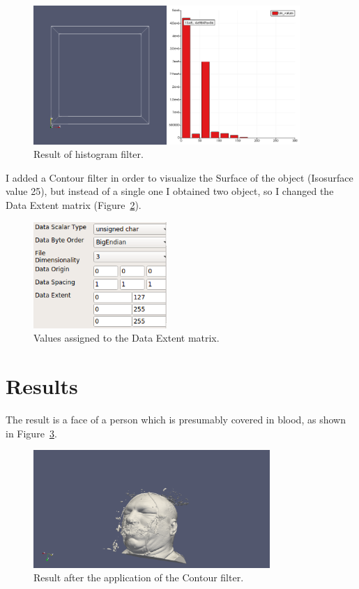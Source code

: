 \documentclass[a4paper]{article}
\begin{document}
\begin{figure}[htbp]
\centering
\includegraphics[width=0.9\textwidth]{res/screen_hist.png}
\caption{Result of histogram filter.}
\label{img:histogram}
\end{figure}

I added a Contour filter in order to visualize the Surface of the object (Isosurface value 25), but instead of a single one I obtained two object, so I changed the Data Extent matrix (Figure~\ref{img:data_extent}).

\begin{figure}[htbp]
\centering
\includegraphics[width=0.45\textwidth]{res/data_extent.png}
\caption{Values assigned to the Data Extent matrix.}
\label{img:data_extent}
\end{figure}

\section{Results}

The result is a face of a person which is presumably covered in blood, as shown in Figure~\ref{img:face}.

\begin{figure}[htbp]
\centering
\includegraphics[width=0.8\textwidth]{res/face.png}
\caption{Result after the application of the Contour filter.}
\label{img:face}
\end{figure}
\end{document}

